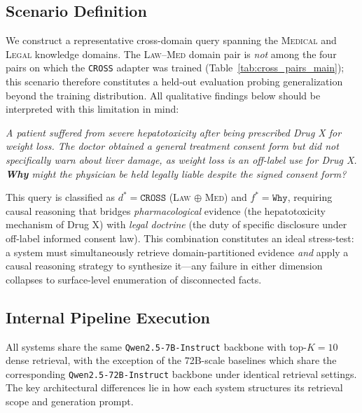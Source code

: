 \documentclass[a4paper,fleql]{cas-sc}
\begin{document}
\subsection{Scenario Definition}
\label{ssec:scenario}
We construct a representative cross-domain query spanning the \textsc{Medical}
and \textsc{Legal} knowledge domains. The \textsc{Law}--\textsc{Med} domain
pair is \emph{not} among the four pairs on which the \texttt{CROSS} adapter
was trained (Table~\ref{tab:cross_pairs_main}); this scenario therefore
constitutes a held-out evaluation probing generalization beyond the training
distribution. All qualitative findings below should be interpreted with this
limitation in mind:
\vspace{4pt}
\begin{tcolorbox}[colback=gray!8, colframe=gray!40, arc=2pt,
  boxrule=0.5pt, left=6pt, right=6pt, top=4pt, bottom=4pt]
\small\itshape
A patient suffered from severe hepatotoxicity after being prescribed Drug X
for weight loss. The doctor obtained a general treatment consent form but did
not specifically warn about liver damage, as weight loss is an off-label use
for Drug X. \textbf{Why} might the physician be held legally liable despite
the signed consent form?
\end{tcolorbox}
\vspace{4pt}
\noindent
This query is classified as $d^* = \texttt{CROSS}$ (\textsc{Law} $\oplus$
\textsc{Med}) and $f^* = \texttt{Why}$, requiring causal reasoning that bridges
\textit{pharmacological} evidence (the hepatotoxicity mechanism of Drug X) with
\textit{legal doctrine} (the duty of specific disclosure under off-label
informed consent law). This combination constitutes an ideal stress-test: a
system must simultaneously retrieve domain-partitioned evidence \emph{and}
apply a causal reasoning strategy to synthesize it---any failure in either
dimension collapses to surface-level enumeration of disconnected facts.

\subsection{Internal Pipeline Execution}
\label{ssec:pipeline}
All systems share the same \texttt{Qwen2.5-7B-Instruct} backbone with
top-$K{=}10$ dense retrieval, with the exception of the 72B-scale baselines
which share the corresponding \texttt{Qwen2.5-72B-Instruct} backbone under
identical retrieval settings. The key architectural differences lie in how
each system structures its retrieval scope and generation prompt.
\end{document}
